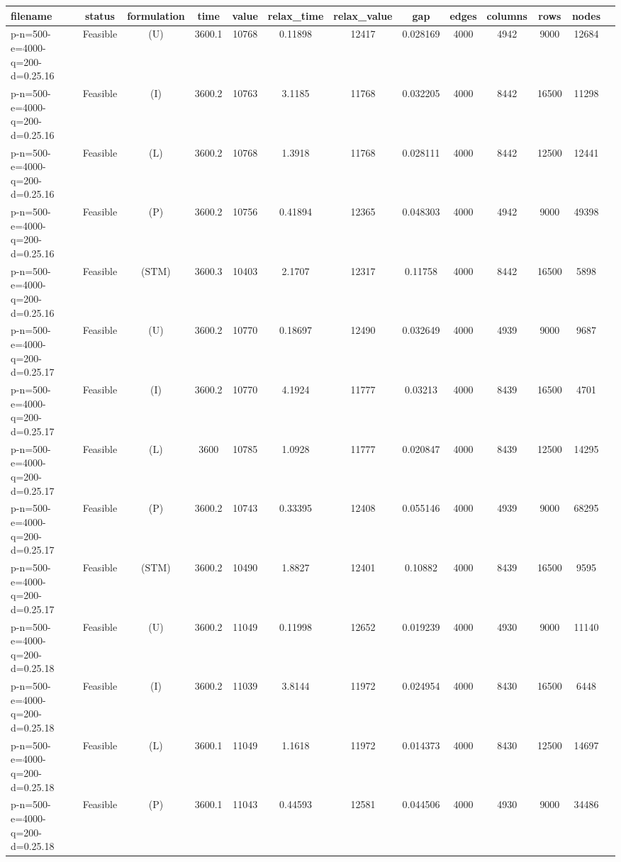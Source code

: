 \documentclass[landscape, a4paper]{article}
\newcommand{\STM}{\ensuremath{\mathrm{STM}}}
\newcommand{\Improved}{\ensuremath{\mathrm{I}}}
\newcommand{\Loose}{\ensuremath{\mathrm{L}}}
\newcommand{\Profit}{\ensuremath{\mathrm{P}}}
\newcommand{\Utility}{\ensuremath{\mathrm{U}}}
\begin{document}
\begin{center}
\begin{tabular}{lcccccccccccc}
filename & status & formulation & time & value & relax\_time & relax\_value & gap & edges & columns & rows & nodes & \\
\hline
p-n=500-e=4000-q=200-d=0.25.16 & Feasible & (\Utility) & 3600.1 & 10768 & 0.11898 & 12417 & 0.028169 & 4000 & 4942 & 9000 & 12684 & \\
p-n=500-e=4000-q=200-d=0.25.16 & Feasible & (\Improved) & 3600.2 & 10763 & 3.1185 & 11768 & 0.032205 & 4000 & 8442 & 16500 & 11298 & \\
p-n=500-e=4000-q=200-d=0.25.16 & Feasible & (\Loose) & 3600.2 & 10768 & 1.3918 & 11768 & 0.028111 & 4000 & 8442 & 12500 & 12441 & \\
p-n=500-e=4000-q=200-d=0.25.16 & Feasible & (\Profit) & 3600.2 & 10756 & 0.41894 & 12365 & 0.048303 & 4000 & 4942 & 9000 & 49398 & \\
p-n=500-e=4000-q=200-d=0.25.16 & Feasible & (\STM) & 3600.3 & 10403 & 2.1707 & 12317 & 0.11758 & 4000 & 8442 & 16500 & 5898 & \\
p-n=500-e=4000-q=200-d=0.25.17 & Feasible & (\Utility) & 3600.2 & 10770 & 0.18697 & 12490 & 0.032649 & 4000 & 4939 & 9000 & 9687 & \\
p-n=500-e=4000-q=200-d=0.25.17 & Feasible & (\Improved) & 3600.2 & 10770 & 4.1924 & 11777 & 0.03213 & 4000 & 8439 & 16500 & 4701 & \\
p-n=500-e=4000-q=200-d=0.25.17 & Feasible & (\Loose) & 3600 & 10785 & 1.0928 & 11777 & 0.020847 & 4000 & 8439 & 12500 & 14295 & \\
p-n=500-e=4000-q=200-d=0.25.17 & Feasible & (\Profit) & 3600.2 & 10743 & 0.33395 & 12408 & 0.055146 & 4000 & 4939 & 9000 & 68295 & \\
p-n=500-e=4000-q=200-d=0.25.17 & Feasible & (\STM) & 3600.2 & 10490 & 1.8827 & 12401 & 0.10882 & 4000 & 8439 & 16500 & 9595 & \\
p-n=500-e=4000-q=200-d=0.25.18 & Feasible & (\Utility) & 3600.2 & 11049 & 0.11998 & 12652 & 0.019239 & 4000 & 4930 & 9000 & 11140 & \\
p-n=500-e=4000-q=200-d=0.25.18 & Feasible & (\Improved) & 3600.2 & 11039 & 3.8144 & 11972 & 0.024954 & 4000 & 8430 & 16500 & 6448 & \\
p-n=500-e=4000-q=200-d=0.25.18 & Feasible & (\Loose) & 3600.1 & 11049 & 1.1618 & 11972 & 0.014373 & 4000 & 8430 & 12500 & 14697 & \\
p-n=500-e=4000-q=200-d=0.25.18 & Feasible & (\Profit) & 3600.1 & 11043 & 0.44593 & 12581 & 0.044506 & 4000 & 4930 & 9000 & 34486 & \\

\end{tabular}
\end{center}
\end{document}

